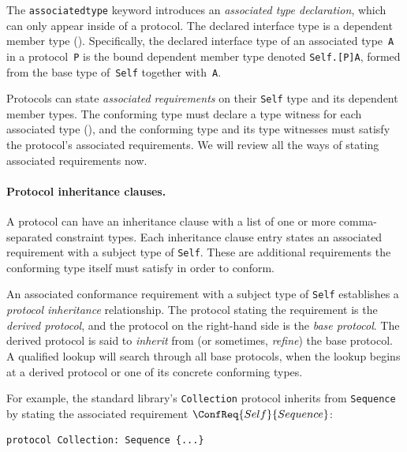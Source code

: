 \documentclass[../generics]{subfiles}
\begin{document}
The \texttt{associatedtype} keyword introduces an \emph{associated type declaration}, which can only appear inside of a protocol. The declared interface type is a dependent member type (). Specifically, the declared interface type of an associated type~\texttt{A} in a protocol~\texttt{P} is the bound dependent member type denoted \texttt{Self.[P]A}, formed from the base type of~\texttt{Self} together with~\texttt{A}.

Protocols can state \emph{associated requirements} on their \texttt{Self} type and its dependent member types. The conforming type must declare a type witness for each associated type (), and the conforming type and its type witnesses must satisfy the protocol's associated requirements. We will review all the ways of stating associated requirements now.

\paragraph{Protocol inheritance clauses.}
A protocol can have an inheritance clause with a list of one or more comma-separated constraint types. Each inheritance clause entry states an associated requirement with a subject type of \texttt{Self}. These are additional requirements the conforming type itself must satisfy in order to conform.

An associated conformance requirement with a subject type of \texttt{Self} establishes a \emph{protocol inheritance} relationship. The protocol stating the requirement is the \emph{derived protocol}, and the protocol on the right-hand side is the \emph{base protocol}. The derived protocol is said to \emph{inherit} from (or sometimes, \emph{refine}) the base protocol. A qualified lookup will search through all base protocols, when the lookup begins at a derived protocol or one of its concrete conforming types.

For example, the standard library's \texttt{Collection} protocol inherits from \texttt{Sequence} by stating the associated requirement $\ConfReq{Self}{Sequence}$:
\begin{Verbatim}
protocol Collection: Sequence {...}
\end{Verbatim}
\end{document}

